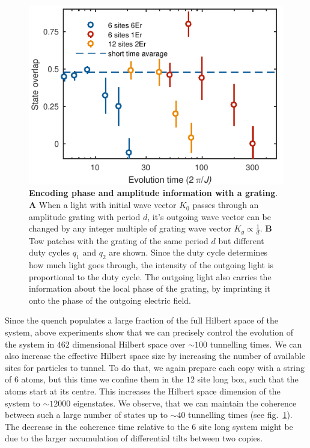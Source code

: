 \begin{figure}[t]
	\centering
	\includegraphics[scale=1]{figures/CBH_MBP_long_time.pdf}
	\caption{{\bf Encoding phase and amplitude information with a grating}. {\bf A} When a light with initial wave vector $K_0$ passes through an amplitude grating with period $d$, it's outgoing wave vector can be changed by any integer multiple of grating wave vector $K_g\propto \frac{1}{d}$. {\bf B} Tow patches with the grating of the same period $d$ but different duty cycles $q_1$ and $q_2$ are shown. Since the duty cycle determines how much light goes through, the intensity of the outgoing light is proportional to the duty cycle. The outgoing light also carries the information about the local phase of the grating, by imprinting it onto the phase of the outgoing electric field.}
	\label{fig:CBH_MBP_long_time}
\end{figure}

Since the quench populates a large fraction of the full Hilbert space of the system, above experiments show that we can precisely control the evolution of the system in $462$ dimensional Hilbert space over $\sim 100$ tunnelling times. We can also increase the effective Hilbert space size by increasing the number of available sites for particles to tunnel. To do that, we again prepare each copy with a string of $6$ atoms, but this time we confine them in the $12$ site long box, such that the atoms start at its centre. This increases the Hilbert space dimension of the system to $\sim 12 000$ eigenstates. We observe, that we can maintain the coherence between such a large number of states up to $\sim 40$ tunnelling times (see fig.~\ref{fig:CBH_MBP_long_time}). The decrease in the coherence time relative to the $6$ site long system might be due to the larger accumulation of differential tilts between two copies.  

